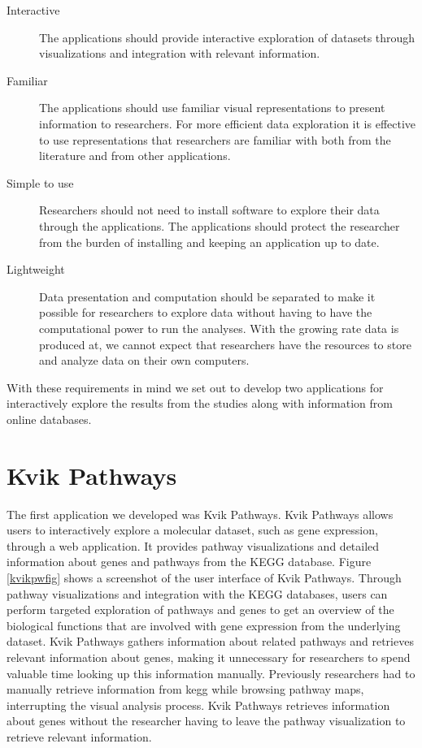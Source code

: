 \begin{description} 
\item[Interactive] The applications should provide interactive exploration
    of datasets through visualizations and integration with relevant
    information.
    
\item[Familiar] The applications should use familiar visual representations to
    present information to researchers. For more efficient data exploration it
        is effective to use representations that researchers are familiar with
        both from the literature and from other applications. 
    
\item[Simple to use] Researchers should not need to install software to
    explore their data through the applications. The applications should 
    protect the researcher from the burden of installing and keeping an
    application up to date. 
    
\item[Lightweight] Data presentation and computation should be separated
    to make it possible for researchers to explore data without having to
    have the computational power to run the analyses. With the growing rate
    data is produced at, we cannot expect that researchers have the resources to
    store and analyze data on their own computers. 
    
\end{description}

With these requirements in mind we set out to develop two applications for
interactively explore the results from the studies along with information
from online databases. 

\section{Kvik Pathways}
The first application we developed was Kvik Pathways. Kvik Pathways allows users
to interactively explore a molecular dataset, such as gene expression, through a
web application. It provides pathway visualizations and detailed information
about genes and pathways from the KEGG database. Figure \ref{kvikpwfig} shows a
screenshot of the user interface of Kvik Pathways. Through pathway
visualizations and integration with the KEGG databases, users can perform
targeted exploration of pathways and genes to get an overview of the biological
functions that are involved with gene expression from the underlying dataset.
Kvik Pathways gathers information about related pathways and retrieves relevant
information about genes, making it unnecessary for researchers to spend valuable
time looking up this information manually. Previously researchers had to
manually retrieve information from \gls{kegg} while browsing pathway maps,
interrupting the visual analysis process.  Kvik Pathways retrieves information
about genes without the researcher having to leave the pathway visualization to
retrieve relevant information.

